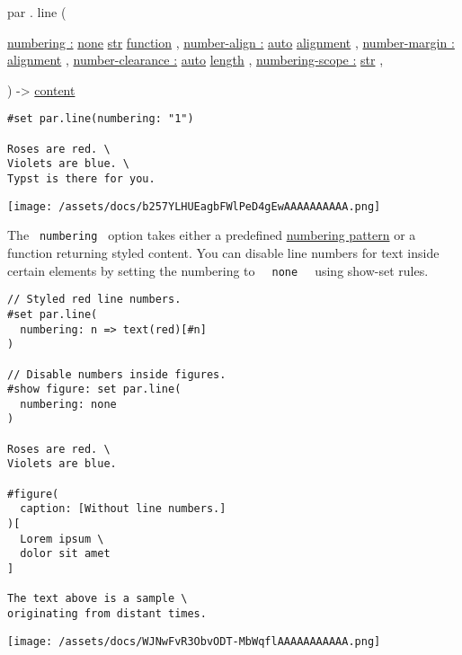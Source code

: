 par { . } { line } (

{ \hyperref[definitions-line-parameters-numbering]{numbering :}
\href{/docs/reference/foundations/none/}{none}
\href{/docs/reference/foundations/str/}{str}
\href{/docs/reference/foundations/function/}{function} , } {
\hyperref[definitions-line-parameters-number-align]{number-align :}
\href{/docs/reference/foundations/auto/}{auto}
\href{/docs/reference/layout/alignment/}{alignment} , } {
\hyperref[definitions-line-parameters-number-margin]{number-margin :}
\href{/docs/reference/layout/alignment/}{alignment} , } {
\hyperref[definitions-line-parameters-number-clearance]{number-clearance
:} \href{/docs/reference/foundations/auto/}{auto}
\href{/docs/reference/layout/length/}{length} , } {
\hyperref[definitions-line-parameters-numbering-scope]{numbering-scope
:} \href{/docs/reference/foundations/str/}{str} , }

) -\textgreater{} \href{/docs/reference/foundations/content/}{content}

\begin{verbatim}
#set par.line(numbering: "1")

Roses are red. \
Violets are blue. \
Typst is there for you.
\end{verbatim}

\texttt{[image: /assets/docs/b257YLHUEagbFWlPeD4gEwAAAAAAAAAA.png]}

The \texttt{\ numbering\ } option takes either a predefined
\href{/docs/reference/model/numbering/}{numbering pattern} or a function
returning styled content. You can disable line numbers for text inside
certain elements by setting the numbering to
\texttt{\ }{\texttt{\ none\ }}\texttt{\ } using show-set rules.

\begin{verbatim}
// Styled red line numbers.
#set par.line(
  numbering: n => text(red)[#n]
)

// Disable numbers inside figures.
#show figure: set par.line(
  numbering: none
)

Roses are red. \
Violets are blue.

#figure(
  caption: [Without line numbers.]
)[
  Lorem ipsum \
  dolor sit amet
]

The text above is a sample \
originating from distant times.
\end{verbatim}

\texttt{[image: /assets/docs/WJNwFvR3ObvODT-MbWqflAAAAAAAAAAA.png]}

